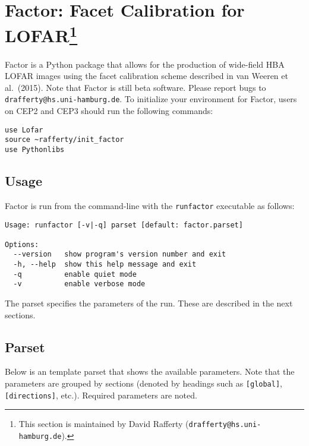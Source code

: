 \documentclass[structabstract]{article}
\begin{document}

\section[Factor: Facet Calibration for LOFAR]{Factor: Facet Calibration for
LOFAR\footnote{This section is maintained by David Rafferty
({\tt drafferty@hs.uni-hamburg.de}).}}
\label{factor}

Factor is a Python package that allows for the production of wide-field HBA
LOFAR images using the facet calibration scheme described in van Weeren et al.\
(2015). Note that Factor is still beta software. Please report bugs to
{\tt drafferty@hs.uni-hamburg.de}. To initialize your environment for Factor,
users on CEP2 and CEP3 should run the following commands:
\begin{verbatim}
use Lofar
source ~rafferty/init_factor
use Pythonlibs
\end{verbatim}

\subsection{Usage}
\label{factor:usage}

Factor is run from the command-line with the {\tt runfactor} executable as
follows:
\begin{verbatim}
Usage: runfactor [-v|-q] parset [default: factor.parset]

Options:
  --version   show program's version number and exit
  -h, --help  show this help message and exit
  -q          enable quiet mode
  -v          enable verbose mode
\end{verbatim}
The parset specifies the parameters of the run. These are described in the next
sections.

\subsection{Parset}
\label{factor:parset}

Below is an template parset that shows the available parameters. Note that the
parameters are grouped by sections (denoted by headings such as {\tt [global]},
{\tt [directions]}, etc.). Required parameters are noted.
\end{document}
